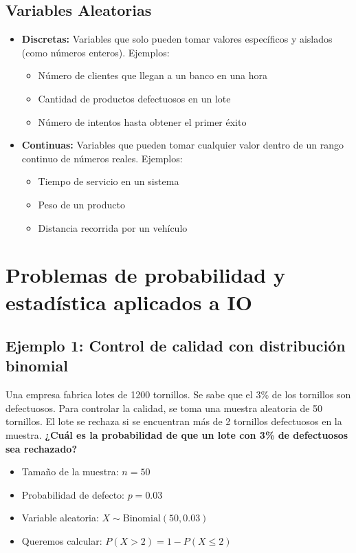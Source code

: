 \documentclass[12pt]{article}
\begin{document}
\subsection{Variables Aleatorias}
\begin{itemize}
    \item \textbf{Discretas:} Variables que solo pueden tomar valores específicos y aislados (como números enteros). Ejemplos:
    \begin{itemize}
        \item Número de clientes que llegan a un banco en una hora
        \item Cantidad de productos defectuosos en un lote
        \item Número de intentos hasta obtener el primer éxito
    \end{itemize}
    \item \textbf{Continuas:} Variables que pueden tomar cualquier valor dentro de un rango continuo de números reales. Ejemplos:
    \begin{itemize}
        \item Tiempo de servicio en un sistema
        \item Peso de un producto
        \item Distancia recorrida por un vehículo
    \end{itemize}
\end{itemize}

\section{Problemas de probabilidad y estadística aplicados a IO}

\subsection{Ejemplo 1: Control de calidad con distribución binomial}

Una empresa fabrica lotes de 1200 tornillos. Se sabe que el 3\% de los tornillos son defectuosos. Para controlar la calidad, se toma una muestra aleatoria de 50 tornillos. El lote se rechaza si se encuentran más de 2 tornillos defectuosos en la muestra. \textbf{¿Cuál es la probabilidad de que un lote con 3\% de defectuosos sea rechazado?}

\vspace{0.5em}

\begin{itemize}
    \item Tamaño de la muestra: $n = 50$
    \item Probabilidad de defecto: $p = 0.03$
    \item Variable aleatoria: $X \sim \text{Binomial}(50, 0.03)$
    \item Queremos calcular: $P(X > 2) = 1 - P(X \leq 2)$
\end{itemize}
\end{document}
